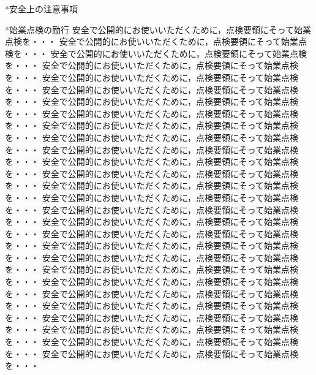 \documentclass[11pt]{ltjsarticle}
\makeatletter
\newcommand{\linesparpage}[1]{%
    \setlength{\baselineskip}{\dimexpr \textheight / #1 \relax}%
}
\renewcommand{\section}{%
    \@ifstar{\customsectionstar}{\customsection}} %
\newcommand{\customsection}[1]{%
    \cleardoublepage %
    \newgeometry{top=80truemm, bottom=18truemm, left=23truemm, right=23truemm}
    \thispagestyle{empty} %
    \setcounter{page}{0} %
    \stepcounter{section} %
    \leftskip = 0pt%
    \markboth{\protect\textcolor{white}{\thesection 章 #1}}{} %
    \begin{tcolorbox}[colback=gray!20, colframe=black, sharp corners, 
                        top=5mm, left=0mm, bottom=5mm, right=0mm,
                        boxrule=0pt, toprule=1.5pt, bottomrule=1.5pt, 
                        width=\linewidth ] %
        \fontsize{34pt}{34pt}\selectfont\bfseries\gtfamily\centering \thesection 章 \hspace{1ex} #1
    \end{tcolorbox}%
    \clearpage
    \restoregeometry
}
\newcommand{\customsectionstar}[1]{%
    \cleardoublepage %
    \newgeometry{top=80truemm, bottom=18truemm, left=23truemm, right=23truemm}
    \thispagestyle{empty} %
    \setcounter{page}{0} %
    \leftskip = 0pt%
    \markboth{\protect\textcolor{white}{#1}}{} %
    \begin{tcolorbox}[colback=gray!20, colframe=black, sharp corners, 
                        top=5mm, left=0mm, bottom=5mm, right=0mm,
                        boxrule=0pt, toprule=1.5pt, bottomrule=1.5pt, 
                        width=\linewidth ]
        \fontsize{34pt}{34pt}\selectfont\bfseries\gtfamily\centering #1
    \end{tcolorbox}%
    \clearpage
    \restoregeometry
}
\renewcommand{\subsubsection}{%
    \@ifstar{\customsubsubsectionstar}{\customsubsubsection}} %
\newcommand{\customsubsubsection}[1]{%
    \leftskip = 0pt%
    \refstepcounter{subsubsection}%
    \noindent{\normalsize\bfseries \alph{subsubsection}. #1}%
    \par\nobreak\vspace{0.5ex}%
    \leftskip = 2em%
}
\newcommand{\customsubsubsectionstar}[1]{%
    \leftskip = 0pt%
    \noindent{\normalsize\bfseries $\blacksquare$ \hspace{0em} #1}%
    \par\nobreak\vspace{0.5ex}%
    \leftskip = 1.5em%
}
\makeatother
\begin{document}
\linesparpage{42}
\layout


\section*{安全上の注意事項}

\subsubsection{点検・整備時の注意}

\subsubsection*{始業点検の励行}
安全で公開的にお使いいただくために，点検要領にそって始業点検を・・・
安全で公開的にお使いいただくために，点検要領にそって始業点検を・・・
安全で公開的にお使いいただくために，点検要領にそって始業点検を・・・
安全で公開的にお使いいただくために，点検要領にそって始業点検を・・・
安全で公開的にお使いいただくために，点検要領にそって始業点検を・・・
安全で公開的にお使いいただくために，点検要領にそって始業点検を・・・
安全で公開的にお使いいただくために，点検要領にそって始業点検を・・・
安全で公開的にお使いいただくために，点検要領にそって始業点検を・・・
安全で公開的にお使いいただくために，点検要領にそって始業点検を・・・
安全で公開的にお使いいただくために，点検要領にそって始業点検を・・・
安全で公開的にお使いいただくために，点検要領にそって始業点検を・・・
安全で公開的にお使いいただくために，点検要領にそって始業点検を・・・
安全で公開的にお使いいただくために，点検要領にそって始業点検を・・・
安全で公開的にお使いいただくために，点検要領にそって始業点検を・・・
安全で公開的にお使いいただくために，点検要領にそって始業点検を・・・
安全で公開的にお使いいただくために，点検要領にそって始業点検を・・・
安全で公開的にお使いいただくために，点検要領にそって始業点検を・・・
安全で公開的にお使いいただくために，点検要領にそって始業点検を・・・
安全で公開的にお使いいただくために，点検要領にそって始業点検を・・・
安全で公開的にお使いいただくために，点検要領にそって始業点検を・・・
安全で公開的にお使いいただくために，点検要領にそって始業点検を・・・
安全で公開的にお使いいただくために，点検要領にそって始業点検を・・・
安全で公開的にお使いいただくために，点検要領にそって始業点検を・・・
安全で公開的にお使いいただくために，点検要領にそって始業点検を・・・
安全で公開的にお使いいただくために，点検要領にそって始業点検を・・・
安全で公開的にお使いいただくために，点検要領にそって始業点検を・・・
安全で公開的にお使いいただくために，点検要領にそって始業点検を・・・
安全で公開的にお使いいただくために，点検要領にそって始業点検を・・・
\end{document}
